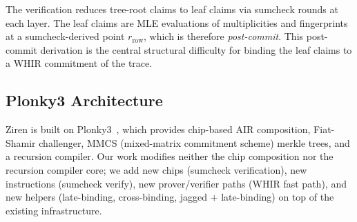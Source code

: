 The verification reduces tree-root claims to leaf claims via
sumcheck rounds at each layer.  The leaf claims are MLE evaluations
of multiplicities and fingerprints at a sumcheck-derived point
$r_{\mathrm{row}}$, which is therefore \emph{post-commit}.  This
post-commit derivation is the central structural difficulty for
binding the leaf claims to a WHIR commitment of the trace.

\subsection{Plonky3 Architecture}

Ziren is built on Plonky3~\cite{plonky3}, which provides chip-based
AIR composition, Fiat-Shamir challenger, MMCS (mixed-matrix
commitment scheme) merkle trees, and a recursion compiler.  Our
work modifies neither the chip composition nor the recursion
compiler core; we add new chips (sumcheck verification),
new instructions (sumcheck verify), new prover/verifier paths
(WHIR fast path), and new helpers (late-binding, cross-binding,
jagged + late-binding) on top of the existing infrastructure.

